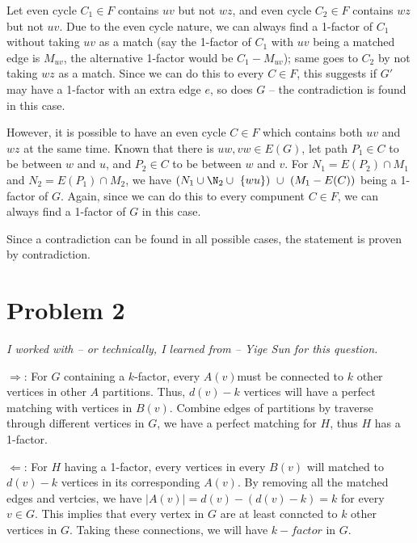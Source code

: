 \documentclass[11pt]{article}
\begin{document}
Let even cycle $C_1 \in F$ contains $uv$ but not $wz$, and even cycle $C_2 \in F$ contains $wz$ but not $uv$. Due to the even cycle nature, we can always find a 1-factor of $C_1$ without taking $uv$ as a match (say the 1-factor of $C_1$ with $uv$ being a matched edge is $M_{uv}$, the alternative 1-factor would be $C_1 - M_{uv}$); same goes to $C_2$ by not taking $wz$ as a match. Since we can do this to every $C \in F$, this suggests if $G'$ may have a 1-factor with an extra edge $e$, so does $G$ -- the contradiction is found in this case.

However, it is possible to have an even cycle $C \in F$ which contains both $uv$ and $wz$ at the same time. Known that there is $uw, vw \in E(G)$, let path $P_1 \in C$ to be between $w$ and $u$, and $P_2 \in C$ to be between $w$ and $v$. For $N_1 = E(P_2) \cap M_1$ and $N_2 = E(P_1) \cap M_2$, we have $(N_1 \cup \N_2 \cup \ \{wu\})  \ \cup \ (M_1 - E(C))$ being a 1-factor of $G$. Again, since we can do this to every compunent $C \in F$, we can always find a 1-factor of $G$ in this case.\newline

Since a contradiction can be found in all possible cases, the statement is proven by contradiction.








\section{Problem 2}

\textit{I worked with -- or technically, I learned from -- Yige Sun for this question.}\newline

$\Longrightarrow$: For $G$ containing a $k$-factor, every $A(v) $must be connected to $k$ other vertices in other $A$ partitions. Thus, $d(v) - k$ vertices will have a perfect matching with vertices in $B(v)$. Combine edges of partitions by traverse through different vertices in $G$, we have a perfect matching for $H$, thus $H$ has a 1-factor.\newline

$\Longleftarrow$: For $H$ having a 1-factor, every vertices in every $B(v)$ will matched to $d(v)-k$ vertices in its corresponding $A(v)$. By removing all the matched edges and vertcies, we have $|A(v)| = d(v) - (d(v) - k) = k$ for every $v \in G$. This implies that every vertex in $G$ are at least conncted to $k$ other vertices in $G$. Taking these connections, we will have $k-factor$ in $G$.


%
% 
% 
\end{document}
